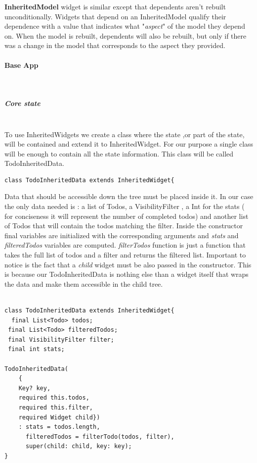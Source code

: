 \textbf{InheritedModel} widget is similar except that dependents aren't rebuilt unconditionally.
Widgets that depend on an InheritedModel qualify their dependence with a value that indicates what "\textit{aspect}" of the model they depend on. When the model is rebuilt, dependents will also be rebuilt, but only if there was a change in the model that corresponds to the aspect they provided.
\paragraph{Base App} \mbox{} \\
\label{par:inherited_widget_base_app}
\subparagraph{Core state}\mbox{}\\
\label{subpar:inherited_widget_core_state}
To use InheritedWidgets we create a class where the state ,or part of the state, will be contained and extend it to InheritedWidget. For our purpose a single class will be enough to contain all the state information. This class will be called TodoInheritedData.

\begin{verbatim}
class TodoInheritedData extends InheritedWidget{
\end{verbatim}
\mbox{}

Data that should be accessible down the tree must be placed inside it. In our case the only data needed is : a list of Todos, a VisibilityFilter , a Int for the stats ( for conciseness it will represent the number of completed todos) and another list of Todos that will contain the todos matching the filter. Inside the constructor final variables are initialized with the corresponding arguments and \textit{stats} and \textit{filteredTodos} variables are computed. \textit{filterTodos} function is just a function that takes the full list of todos and a filter and returns the filtered list. Important to notice is the fact that a \textit{child} widget must be also passed in the constructor. This is because our TodoInheritedData is nothing else than a widget itself that wraps the data and make them accessible in the child tree.
\mbox{}\\

\begin{verbatim}

class TodoInheritedData extends InheritedWidget{
  final List<Todo> todos;
 final List<Todo> filteredTodos;
 final VisibilityFilter filter;
 final int stats;
 
TodoInheritedData(
    { 
    Key? key,
    required this.todos,
    required this.filter,
    required Widget child})
    : stats = todos.length,
      filteredTodos = filterTodo(todos, filter),
      super(child: child, key: key);
}
\end{verbatim}


